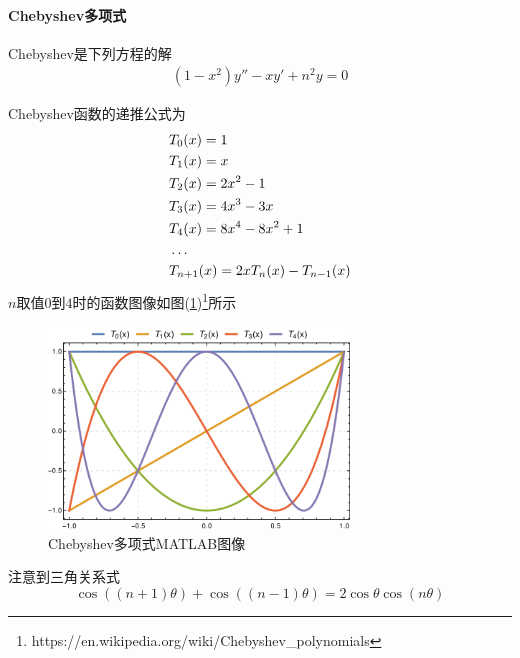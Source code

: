                 \paragraph{Chebyshev多项式} Chebyshev是下列方程的解
                \begin{align*}
                (1-x^2)y'' - xy' +n^2y = 0
                \end{align*}
                \par
                Chebyshev函数的递推公式为
                \begin{align}
                    \label{Cheby的递推公式}
                    &T_0(x) = 1 \notag \\
                    &T_1(x) = x \notag \\
                    &T_2(x) = 2x^2 - 1 \notag \\
                    &T_3(x) = 4x^3 - 3x \notag \\
                    &T_4(x) = 8x^4 - 8x^2 +1 \notag \\
                    &\dots \notag \\
                    &T_{n+1}(x) = 2xT_n(x) - T_{n-1}(x)
                \end{align}
                $n$取值$0$到$4$时的函数图像如图(\ref{fig:Chebyshev多项式MATLAB图像})\footnote{https://en.wikipedia.org/wiki/Chebyshev\_polynomials}所示
                \begin{figure}[H]
                \centering
                \includegraphics[width=8cm]{images/Chebyshev_polynomial_matlab_pic.png}
                \caption{Chebyshev多项式MATLAB图像}
                \label{fig:Chebyshev多项式MATLAB图像}
                \end{figure}
                \par
                注意到三角关系式
                \[
                    \cos((n+1)\theta) + \cos((n-1)\theta) = 2\cos\theta \cos(n\theta)
                \]
